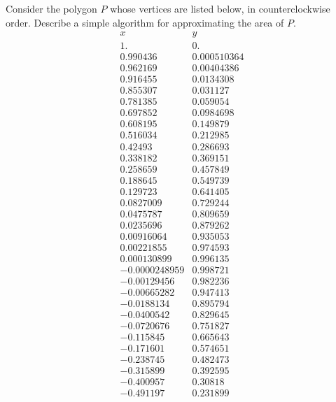 \documentclass{watsonbook}
\begin{document}
\begin{aexercise}
  Consider the polygon $P$ whose vertices are listed below, in
  counterclockwise order. Describe a simple algorithm for
  approximating the area of $P$.  {\tiny
    $$
    \begin{array}{cc}
      x & y \\ \hline 
      1. & 0. \\
      0.990436 & 0.000510364 \\
      0.962169 & 0.00404386 \\
      0.916455 & 0.0134308 \\
      0.855307 & 0.031127 \\
      0.781385 & 0.059054 \\
      0.697852 & 0.0984698 \\
      0.608195 & 0.149879 \\
      0.516034 & 0.212985 \\
      0.42493 & 0.286693 \\
      0.338182 & 0.369151 \\
      0.258659 & 0.457849 \\
      0.188645 & 0.549739 \\
      0.129723 & 0.641405 \\
      0.0827009 & 0.729244 \\
      0.0475787 & 0.809659 \\
      0.0235696 & 0.879262 \\
      0.00916064 & 0.935053 \\
      0.00221855 & 0.974593 \\
      0.000130899 & 0.996135 \\
      -0.0000248959 & 0.998721 \\
      -0.00129456 & 0.982236 \\
      -0.00665282 & 0.947413 \\
      -0.0188134 & 0.895794 \\
      -0.0400542 & 0.829645 \\
      -0.0720676 & 0.751827 \\
      -0.115845 & 0.665643 \\
      -0.171601 & 0.574651 \\
      -0.238745 & 0.482473 \\
      -0.315899 & 0.392595 \\
      -0.400957 & 0.30818 \\
      -0.491197 & 0.231899 \\

\end{array}$$}
\end{aexercise}
\end{document}
